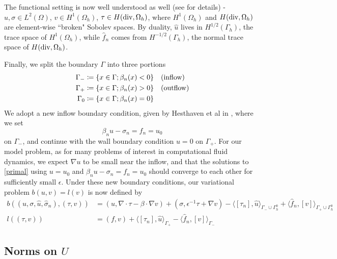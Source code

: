 \documentclass[11pt,onecolumn]{scrartcl}
\newcommand{\grad}{\nabla}
\renewcommand{\div}{\grad \cdot}
\begin{document}
 The functional setting is now well understood as well (see \cite{analysisDPG} for details) - $u,\sigma \in L^2(\Omega)$, $v \in H^1(\Omega_h)$, $\tau \in H({\rm div},\Omega_h)$, where $H^1(\Omega_h)$ and $H({\rm div},\Omega_h)$ are element-wise ``broken" Sobolev spaces.  By duality, $\widehat{u}$ lives in $H^{1/2}(\Gamma_h)$, the trace space of $H^1(\Omega_h)$, while $\widehat{f}_n$ comes from $H^{-1/2}(\Gamma_h)$, the normal trace space of $H({\rm div},\Omega_h)$.  

Finally, we split the boundary $\Gamma$ into three portions
\begin{align*}
\Gamma_{-} &\coloneqq \{x\in \Gamma; \beta_n(x) < 0\} \quad {\rm (inflow)}\\
\Gamma_{+} &\coloneqq \{x\in \Gamma; \beta_n(x) > 0\} \quad {\rm (outflow)}\\
\Gamma_{0} &\coloneqq \{x\in \Gamma; \beta_n(x) = 0\}
\end{align*}
We adopt a new inflow boundary condition, given by Hesthaven et al in \cite{Hesthaven96astable}, where we set
\[
\beta_n u - \sigma_n = f_n = u_0
\]
on $\Gamma_-$, and continue with the wall boundary condition $u=0$ on $\Gamma_+$.  For our model problem, as for many problems of interest in computational fluid dynamics, we expect $\grad u$ to be small near the inflow, and that the solutions to \eqref{primal} using $u=u_0$ and $\beta_n u - \sigma_n = f_n = u_0$ should converge to each other for sufficiently small $\epsilon$.  Under these new boundary conditions, our variational problem $b(u,v) = l(v)$ is now defined by
\begin{align*}
b\left(\left(u,\sigma, \widehat{u}, \widehat{\sigma}_n\right), \left(\tau, v\right)\right) &= \left(u,\div \tau - \beta \cdot \grad v\right) + \left(\sigma, \epsilon^{-1} \tau + \grad v\right) - \langle \left[\tau_n\right], \widehat{u} \rangle_{\Gamma_-\cup \Gamma_h^0} + \langle \widehat{f}_n, \left[v\right] \rangle_{\Gamma_+ \cup \Gamma_h^0} \\
l\left(\left(\tau,v\right)\right) &= \left(f, v\right) + \langle \left[\tau_n\right], \widehat{u} \rangle_{\Gamma_+} - \langle \widehat{f}_n, \left[v\right] \rangle_{\Gamma_-} 
\end{align*}

\subsection{Norms on $U$}
\end{document}
